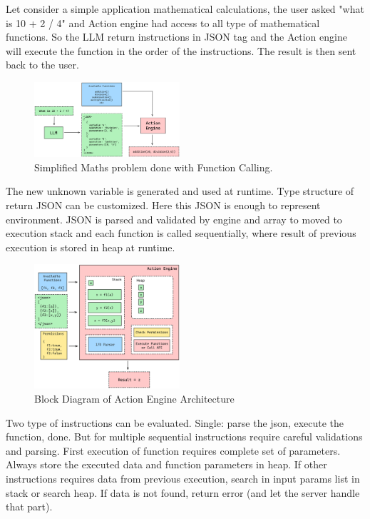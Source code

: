 \documentclass[conference]{IEEEtran}
\begin{document}
Let consider a simple application mathematical calculations, the user asked "what is 10 + 2 / 4" and Action engine had access to all type of mathematical functions. So the LLM return instructions in JSON tag and the Action engine will execute the function in the order of the instructions. The result is then sent back to the user. 


\begin{figure}[htbp]
    \centering
    \includegraphics[width=0.48\textwidth]{images/maths.png}
    \caption{Simplified Maths problem done with Function Calling.}
    \label{fig}
\end{figure}

The new unknown variable is generated and used at runtime. Type structure of return JSON can be customized. Here this JSON is enough to represent environment. JSON is parsed and validated by engine and array to moved to execution stack and each function is called sequentially, where result of previous execution is stored in heap at runtime.

\begin{figure}[htbp]
\centering
\includegraphics[width=0.48\textwidth]{images/action-engine.png}
\caption{Block Diagram of Action Engine Architecture}
\label{fig}
\end{figure}

Two type of instructions can be evaluated. Single: parse the json, execute the function, done. But for multiple sequential instructions require careful validations and parsing. First execution of function requires complete set of parameters. Always store the executed data and function parameters in heap. If other instructions requires data from previous execution, search in input params list in stack or search heap. If data is not found, return error (and let the server handle that part).
\end{document}
